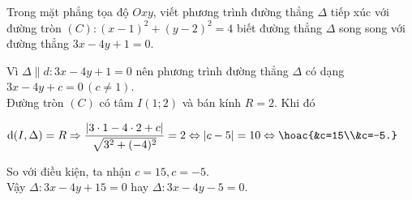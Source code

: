 \begin{bt}%
	Trong mặt phẳng tọa độ $Oxy$, viết phương trình đường thẳng $\Delta$ tiếp xúc với đường tròn $(C)\colon (x-1)^2+(y-2)^2=4$ biết đường thẳng $\Delta$ song song với đường thẳng $3x-4y+1=0$.
	\loigiai
	{
		Vì $\Delta\parallel d\colon 3x-4y+1=0$ nên phương trình đường thẳng $\Delta$ có dạng $3x-4y+c=0\,(c\neq 1)$.\\
		Đường tròn $(C)$ có tâm $I(1;2)$ và bán kính $R=2$. Khi đó
			\begin{center}
				$\mathrm{d}(I,\Delta)=R\Rightarrow \dfrac{|3\cdot1-4\cdot 2+c|}{\sqrt{3^2+(-4)^2}}=2 \Leftrightarrow |c-5|=10 \Leftrightarrow \hoac{&c=15\\&c=-5.}$
			\end{center}
		So với điều kiện, ta nhận $c=15,c=-5$.\\
		Vậy $\Delta\colon 3x-4y+15=0$ hay $\Delta\colon 3x-4y-5=0$.
	}
\end{bt}

